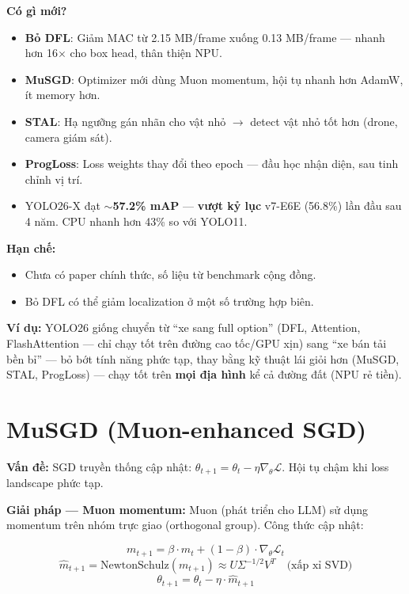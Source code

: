\documentclass[12pt,a4paper]{report}
\begin{document}
\textbf{Có gì mới?}
\begin{itemize}
    \item \textbf{Bỏ DFL}: Giảm MAC từ 2.15 MB/frame xuống 0.13 MB/frame --- nhanh hơn 16$\times$ cho box head, thân thiện NPU.
    \item \textbf{MuSGD}: Optimizer mới dùng Muon momentum, hội tụ nhanh hơn AdamW, ít memory hơn.
    \item \textbf{STAL}: Hạ ngưỡng gán nhãn cho vật nhỏ $\rightarrow$ detect vật nhỏ tốt hơn (drone, camera giám sát).
    \item \textbf{ProgLoss}: Loss weights thay đổi theo epoch --- đầu học nhận diện, sau tinh chỉnh vị trí.
    \item YOLO26-X đạt $\sim$\textbf{57.2\% mAP} --- \textbf{vượt kỷ lục} v7-E6E (56.8\%) lần đầu sau 4 năm. CPU nhanh hơn 43\% so với YOLO11.
\end{itemize}

\textbf{Hạn chế:}
\begin{itemize}
    \item Chưa có paper chính thức, số liệu từ benchmark cộng đồng.
    \item Bỏ DFL có thể giảm localization ở một số trường hợp biên.
\end{itemize}

\textbf{Ví dụ:} YOLO26 giống chuyển từ ``xe sang full option'' (DFL, Attention, FlashAttention --- chỉ chạy tốt trên đường cao tốc/GPU xịn) sang ``xe bán tải bền bỉ'' --- bỏ bớt tính năng phức tạp, thay bằng kỹ thuật lái giỏi hơn (MuSGD, STAL, ProgLoss) --- chạy tốt trên \textbf{mọi địa hình} kể cả đường đất (NPU rẻ tiền).

\section{MuSGD (Muon-enhanced SGD)}

\textbf{Vấn đề:} SGD truyền thống cập nhật: $\theta_{t+1} = \theta_t - \eta \nabla_\theta \mathcal{L}$. Hội tụ chậm khi loss landscape phức tạp.

\textbf{Giải pháp --- Muon momentum:} Muon (phát triển cho LLM) sử dụng momentum trên nhóm trực giao (orthogonal group). Công thức cập nhật:

\begin{equation}
m_{t+1} = \beta \cdot m_t + (1-\beta) \cdot \nabla_\theta \mathcal{L}_t
\end{equation}
\begin{equation}
\hat{m}_{t+1} = \mathrm{NewtonSchulz}(m_{t+1}) \approx U \Sigma^{-1/2} V^T \quad \text{(xấp xỉ SVD)}
\end{equation}
\begin{equation}
\theta_{t+1} = \theta_t - \eta \cdot \hat{m}_{t+1}
\end{equation}
\end{document}
